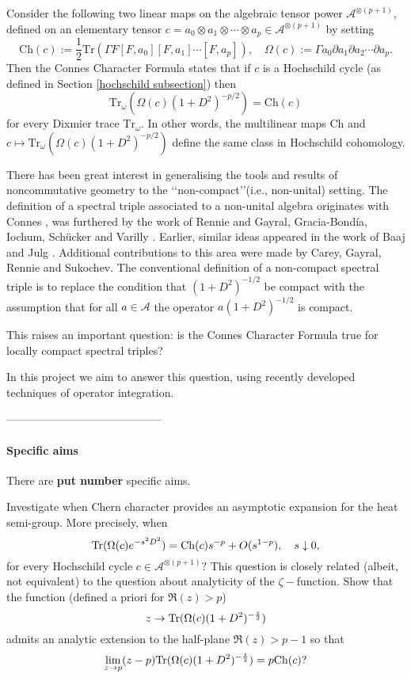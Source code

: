 \documentclass{article}
\begin{document}
Consider the following two linear maps on the algebraic tensor power $\mathcal{A}^{\otimes(p+1)}$,
    defined on an elementary tensor $c = a_0\otimes a_1\otimes \cdots \otimes a_p \in \mathcal{A}^{\otimes(p+1)}$ by setting
$$\mathrm{Ch}(c) := \frac{1}{2}\mathrm{Tr}(\Gamma F[F,a_0][F,a_1]\cdots[F,a_p]),\quad \Omega(c) := \Gamma a_0\partial a_1\partial a_2\cdots \partial a_p.$$
Then the Connes Character Formula states that if $c$ is a Hochschild cycle (as defined in Section \ref{hochschild subsection}) then
    \begin{equation*}
        \mathrm{Tr}_\omega(\Omega(c)(1+D^2)^{-p/2}) = \mathrm{Ch}(c)
    \end{equation*}
    for every Dixmier trace $\mathrm{Tr}_\omega$. In other words, the multilinear maps $\mathrm{Ch}$ and $c \mapsto \mathrm{Tr}_\omega(\Omega(c)(1+D^2)^{-p/2})$ define
    the same class in Hochschild cohomology.
    
There has been great interest in generalising the tools and results of noncommutative geometry to the \lq\lq non-compact\rq\rq (i.e., non-unital) setting. The definition of a spectral triple associated to a non-unital algebra originates with Connes \cite{Connes-reality}, was furthered by the work of Rennie \cite{Rennie-2003, Rennie-2004}     and Gayral, Gracia-Bond\'ia, Iochum, Sch\"ucker and Varilly \cite{gayral-moyal}. Earlier, similar ideas appeared in the work of Baaj and Julg \cite{Baaj-Julg}. Additional contributions to this area were made by Carey, Gayral, Rennie and Sukochev\cite{CGRS1,CGRS2}. The conventional definition  of a non-compact spectral triple is to replace the condition that $(1+D^2)^{-1/2}$ be compact with the assumption that for all $a \in \mathcal{A}$ the operator $a(1+D^2)^{-1/2}$ is compact.
    
This raises an important question: is the Connes Character Formula true for locally compact spectral triples? 
    
    In this project we aim to answer this question, using recently developed techniques of operator integration.
    

------------------------------------------

\paragraph*{Specific aims} There are {\bf put number} specific aims.


 Investigate when Chern character provides an asymptotic expansion for the heat semi-group. More precisely, when 
\begin{equation}\label{heat eq}
{\rm Tr}(\Omega(c)e^{-s^2D^2})={\rm Ch}(c)s^{-p}+O(s^{1-p}),\quad s\downarrow0,
\end{equation}
for every Hochschild cycle $c\in\mathcal{A}^{\otimes (p+1)}?$ This question is closely related (albeit, not equivalent) to the question about analyticity of the $\zeta-$function. Show that the function (defined a priori for $\Re(z)>p$)
$$z\to {\rm Tr}(\Omega(c)(1+D^2)^{-\frac{z}{2}})$$
admits an analytic extension to the half-plane $\Re(z)>p-1$ so that
$$\lim_{z\to p}(z-p){\rm Tr}(\Omega(c)(1+D^2)^{-\frac{z}{2}})=p{\rm Ch}(c)?$$
\end{document}
